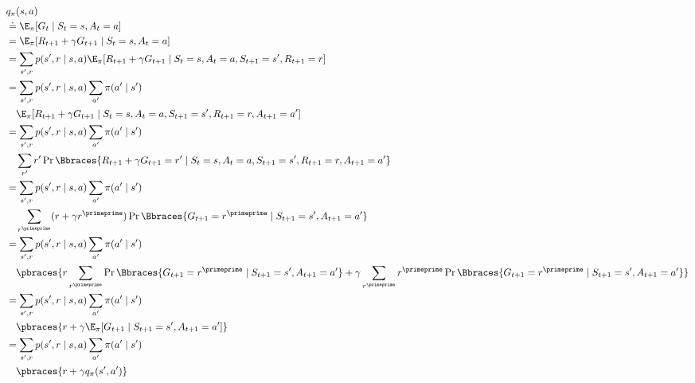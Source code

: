 \begin{solution}

\begin{align*}
    &
    q_\pi(s, a) \\
    & \doteq
    \E_\pi [G_t \mid S_t = s, A_t = a] \\
    & =
    \E_\pi [R_{t+1} + \gamma G_{t+1} \mid S_t = s, A_t = a] \\
    & =
    \sum_{s^\prime, r}
        p(s^\prime, r \mid s, a)
        \E_\pi[R_{t+1} + \gamma G_{t+1} \mid S_t = s, A_t = a, S_{t+1} = s^\prime, R_{t+1} = r] \\
    & =
    \sum_{s^\prime, r}
        p(s^\prime, r \mid s, a)
        \sum_{a^\prime}
            \pi(a^\prime \mid s^\prime) \\ & \quad
            \E_\pi[R_{t+1} + \gamma G_{t+1} \mid S_t = s, A_t = a, S_{t+1} = s^\prime, R_{t+1} = r, A_{t+1} = a^\prime] \\
    & =
    \sum_{s^\prime, r}
        p(s^\prime, r \mid s, a)
        \sum_{a^\prime}
            \pi(a^\prime \mid s^\prime) \\ & \quad
            \sum_{r^\prime}
                r^\prime
                \Pr \Bbraces{R_{t+1} + \gamma G_{t+1} = r^\prime \mid S_t = s, A_t = a, S_{t+1} = s^\prime, R_{t+1} = r, A_{t+1} = a^\prime} \\
    & =
    \sum_{s^\prime, r}
        p(s^\prime, r \mid s, a)
        \sum_{a^\prime}
            \pi(a^\prime \mid s^\prime) \\ & \quad
            \sum_{r^\primeprime}
                (r + \gamma r^\primeprime)
                \Pr \Bbraces{G_{t+1} = r^\primeprime \mid S_{t+1} = s^\prime, A_{t+1} = a^\prime} \\
    & =
    \sum_{s^\prime, r}
        p(s^\prime, r \mid s, a)
        \sum_{a^\prime}
            \pi(a^\prime \mid s^\prime) \\ & \quad
            \pbraces
            {
                r
                \sum_{r^\primeprime}
                    \Pr \Bbraces{G_{t+1} = r^\primeprime \mid S_{t+1} = s^\prime, A_{t+1} = a^\prime}
                +
                \gamma 
                \sum_{r^\primeprime}
                    r^\primeprime
                    \Pr \Bbraces{G_{t+1} = r^\primeprime \mid S_{t+1} = s^\prime, A_{t+1} = a^\prime}
            } \\
    & =
    \sum_{s^\prime, r}
        p(s^\prime, r \mid s, a)
        \sum_{a^\prime}
            \pi(a^\prime \mid s^\prime) \\ & \quad
            \pbraces
            {
                r
                +
                \gamma 
                \E_\pi[G_{t+1} \mid S_{t+1} = s^\prime, A_{t+1} = a^\prime]
            } \\
    & =
    \sum_{s^\prime, r}
        p(s^\prime, r \mid s, a)
        \sum_{a^\prime}
            \pi(a^\prime \mid s^\prime) \\ & \quad
            \pbraces
            {
                r
                +
                \gamma
                q_\pi(s^\prime, a^\prime)
            }
\end{align*}

\end{solution}

